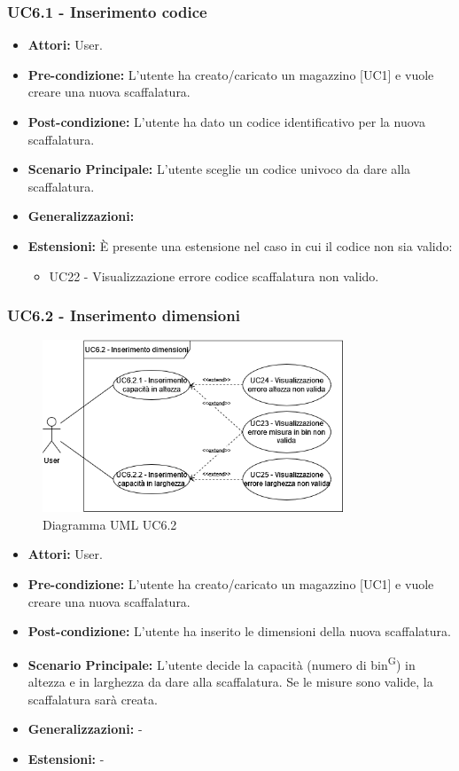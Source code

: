 \subsubsection{UC6.1 - Inserimento codice}
\begin{itemize}
    \item \textbf{Attori:} User.
    \item \textbf{Pre-condizione:}  L'utente ha creato/caricato un magazzino [UC1] e vuole creare una nuova scaffalatura.
    \item \textbf{Post-condizione:} L'utente ha dato un codice identificativo per la nuova scaffalatura.
    \item \textbf{Scenario Principale:}  L'utente sceglie un codice univoco da dare alla scaffalatura.
    \item \textbf{Generalizzazioni:} 
    \item \textbf{Estensioni:} È presente una estensione nel caso in cui il codice non sia valido:
    \begin{itemize}
        \item UC22 - Visualizzazione errore codice scaffalatura non valido.
    \end{itemize}
\end{itemize}


\subsubsection{UC6.2 - Inserimento dimensioni}
\begin{figure}[H]
  \centering
  \includegraphics[width=0.8\textwidth]{UC_diagrams_1-10/UC6.2.drawio.png}
   \caption{Diagramma UML UC6.2}
\end{figure}
\begin{itemize}
    \item \textbf{Attori:} User.
    \item \textbf{Pre-condizione:} L'utente ha creato/caricato un magazzino [UC1] e vuole creare una nuova scaffalatura.
    \item \textbf{Post-condizione:}  L'utente ha inserito le dimensioni della nuova scaffalatura.
    \item \textbf{Scenario Principale:}  L'utente decide la capacità (numero di bin\textsuperscript{G}) in altezza e in larghezza da dare alla scaffalatura. Se le misure sono valide, la scaffalatura sarà creata.
    \item \textbf{Generalizzazioni:} -
    \item \textbf{Estensioni:} -
\end{itemize}


